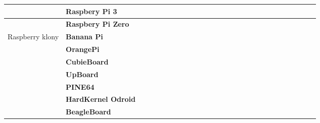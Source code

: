 \begin{table}[!ht]
{\begin{tabular}{|l|l|l|l|l|l|l|l|l|l|l|l|l|l|l|l|l|l|l|l|l|l|l|l|l|l|l|}
 & \textbf{Raspbery Pi 3} &  &  &  &  &  &  &  &  &  &  &  &  &  &  &  &  &  &  &  &  &  &  &  &  &  \\ \hline
 & \textbf{Raspbery Pi Zero} &  &  &  &  &  &  &  &  &  &  &  &  &  &  &  &  &  &  &  &  &  &  &  &  &  \\ \hline
Raspberry klony & \textbf{Banana Pi} &  &  &  &  &  &  &  &  &  &  &  &  &  &  &  &  &  &  &  &  &  &  &  &  &  \\ \hline
 & \textbf{OrangePi} &  &  &  &  &  &  &  &  &  &  &  &  &  &  &  &  &  &  &  &  &  &  &  &  &  \\ \hline
 & \textbf{CubieBoard} &  &  &  &  &  &  &  &  &  &  &  &  &  &  &  &  &  &  &  &  &  &  &  &  &  \\ \hline
 & \textbf{UpBoard} &  &  &  &  &  &  &  &  &  &  &  &  &  &  &  &  &  &  &  &  &  &  &  &  &  \\ \hline
 & \textbf{PINE64} &  &  &  &  &  &  &  &  &  &  &  &  &  &  &  &  &  &  &  &  &  &  &  &  &  \\ \hline
 & \textbf{HardKernel Odroid} &  &  &  &  &  &  &  &  &  &  &  &  &  &  &  &  &  &  &  &  &  &  &  &  &  \\ \hline
 & \textbf{BeagleBoard} &  &  &  &  &  &  &  &  &  &  &  &  &  &  &  &  &  &  &  &  &  &  &  &  &  \\ \hline
\end{tabular}}
\end{table}




